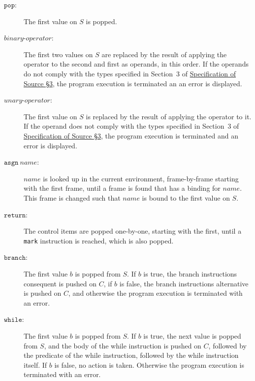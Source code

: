 \begin{description}

\item[$\texttt{pop}$:]
The first value on $S$ is popped.

\item[$\textit{binary-operator}$:]
The first two values on $S$ are replaced by the result of
applying the operator to the second and first as operands, in this order.
If the operands do not comply with the
types specified in Section~3 of
\href{https://docs.sourceacademy.org/source_3.pdf}{\color{blue}Specification of Source \S 3},
the program execution is terminated an an error is displayed.

\item[$\textit{unary-operator}$:]
The first value on $S$ is replaced by the result of
applying the operator to it.
If the operand does not comply with the
types specified in Section~3 of
\href{https://docs.sourceacademy.org/source_3.pdf}{\color{blue}Specification of Source \S 3},
the program execution is terminated and an error is displayed.

\item[$\texttt{asgn}\ \textit{name}$:]
$\textit{name}$ is looked up in the current environment, frame-by-frame starting with the
first frame, 
until a frame is found that has a binding for 
$\textit{name}$.
This frame is changed such that $\textit{name}$ is bound to the first value on $S$.

 
\item[$\texttt{return}$:]
The control items are popped one-by-one, starting with the first, until
a \texttt{mark} instruction is reached, which is also popped.

\item[$\texttt{branch}$:]
The first value $b$ is popped from $S$. If $b$ is true, the branch instructions
consequent is pushed on $C$, if $b$ is false,
the branch instructions
alternative is pushed on $C$, and otherwise the program
execution is terminated with an error.

\item[$\texttt{while}$:]
The first value $b$ is popped from $S$. If $b$ is true,
the next value is popped from $S$, and the body of the
while instruction is pushed on $C$, followed by the predicate
of the while instruction, followed by the while instruction itself.
If $b$ is false, no action is taken.
Otherwise the program
execution is terminated with an error.


\end{description}
